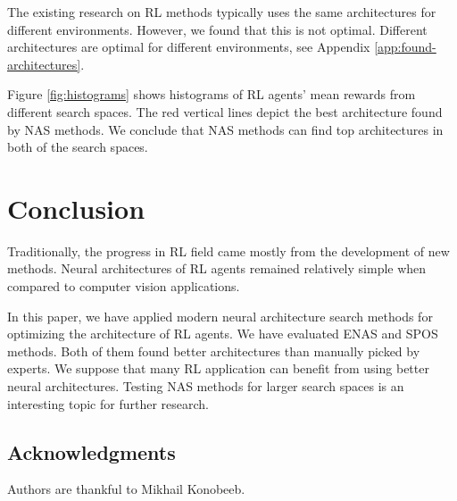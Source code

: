 \documentclass{svproc}
\begin{document}
The existing research on RL methods typically uses the same architectures for different environments.
However, we found that this is not optimal. Different architectures are optimal for different environments, see Appendix \ref{app:found-architectures}.

Figure \ref{fig:histograms} shows histograms of RL agents' mean rewards from different search spaces. The red vertical lines depict the best architecture found by NAS methods. We conclude that NAS methods can find top architectures in both of the search spaces. 



\section{Conclusion}
Traditionally, the progress in RL field came mostly from the development of new methods. Neural architectures of RL agents remained relatively simple when compared to computer vision applications. 

In this paper, we have applied modern neural architecture search methods for optimizing the architecture of RL agents. We have evaluated ENAS \cite{zoph2018learning} and SPOS \cite{guo2019single} methods. Both of them found better architectures than manually picked by experts. We suppose that many RL application can benefit from using better neural architectures.
Testing NAS methods for larger search spaces is an interesting topic for further research.


\subsection*{Acknowledgments}
Authors are thankful to Mikhail Konobeeb.




\nocite{*}
\printbibliography


\newpage
\end{document}
